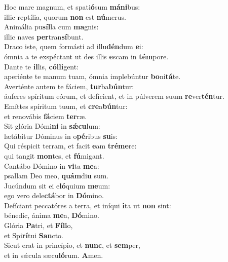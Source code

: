 \evenverse Hoc mare magnum, et spati\textbf{ó}sum \textbf{má}\textbf{ni}bus:~\*\\
\evenverse illic reptília, quorum \textbf{non} est \textbf{nú}merus.\\
\oddverse Animália pu\textbf{síl}la cum \textbf{ma}gnis:~\*\\
\oddverse illic naves \textbf{per}tran\textbf{sí}bunt.\\
\evenverse Draco iste, quem formásti ad illu\textbf{dén}dum \textbf{e}i:~\*\\
\evenverse ómnia a te exspéctant ut des illis \textbf{e}scam in \textbf{tém}pore.\\
\oddverse Dante te \textbf{il}lis, \textbf{cól}\textbf{li}gent:~\*\\
\oddverse aperiénte te manum tuam, ómnia implebúntur \textbf{bo}ni\textbf{tá}te.\\
\evenverse Averténte autem te fáciem, \textbf{tur}ba\textbf{bún}tur:~\*\\
\evenverse áuferes spíritum eórum, et defícient, et in púlverem suum \textbf{re}ver\textbf{tén}tur.\\
\oddverse Emíttes spíritum tuum, et \textbf{cre}a\textbf{bún}tur:~\*\\
\oddverse et renovábis \textbf{fá}ciem \textbf{ter}ræ.\\
\evenverse Sit glória Dómi\textbf{ni} in \textbf{sǽ}\textbf{cu}lum:~\*\\
\evenverse lætábitur Dóminus in o\textbf{pé}ribus \textbf{su}is:\\
\oddverse Qui réspicit terram, et facit \textbf{e}am \textbf{tré}\textbf{me}re:~\*\\
\oddverse qui tangit \textbf{mon}tes, et \textbf{fú}migant.\\
\evenverse Cantábo Dómino in \textbf{vi}ta \textbf{me}a:~\*\\
\evenverse psallam Deo meo, \textbf{quám}di\textbf{u} sum.\\
\oddverse Jucúndum sit ei e\textbf{ló}quium \textbf{me}um:~\*\\
\oddverse ego vero dele\textbf{ctá}bor in \textbf{Dó}mino.\\
\evenverse Defíciant peccatóres a terra, et iníqui \textbf{i}ta ut \textbf{non} sint:~\*\\
\evenverse bénedic, ánima \textbf{me}a, \textbf{Dó}mino.\\
\oddverse Glória \textbf{Pa}tri, et \textbf{Fí}\textbf{li}o,~\*\\
\oddverse et Spi\textbf{rí}tui \textbf{San}cto.\\
\evenverse Sicut erat in princípio, et \textbf{nunc}, et \textbf{sem}per,~\*\\
\evenverse et in sǽcula sæcu\textbf{ló}rum. \textbf{A}men.\\
